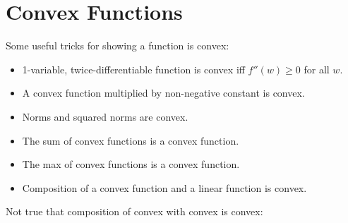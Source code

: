 \setcounter{chapter}{1}
\chapter{Convex Functions}

Some useful tricks for showing a function is convex:
\begin{itemize}
    \item 1-variable, twice-differentiable function is convex iff $f''(w)\ge 0$ for all $w$.
    \item A convex function multiplied by non-negative constant is convex.
    \item Norms and squared norms are convex.
    \item The sum of convex functions is a convex function.
    \item The max of convex functions is a convex function.
    \item Composition of a convex function and a linear function is convex.
\end{itemize}

\begin{remark}
    Not true that composition of convex with convex is convex:
\end{remark}

